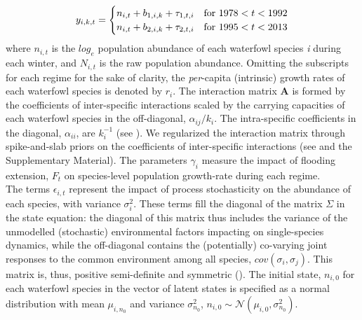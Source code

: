\documentclass[12pt]{article}
\begin{document}
\begin{equation}\label{LVR_Obs_Equation_form}
	y_{i,k,t} =
	\begin{cases}
		n_{i,t} + b_{1,i,k} + \tau_{1,t,i} & \text{for $ 1978 < t < 1992 $}\\
		n_{i,t} + b_{2,i,k} + \tau_{2,t,i} & \text{for $ 1995 < t < 2013 $}\\
	\end{cases}
\end{equation}
where $ n_{i,t} $ is the $log_{e}$ population abundance of each waterfowl species \textit{i} during each winter, and $ N_{i,t} $ is the raw population abundance. Omitting the subscripts for each regime for the sake of clarity, the \textit{per}-capita (intrinsic) growth rates of each waterfowl species is denoted by $ r_{i} $. The interaction matrix $ \mathbf{A} $ is formed by the coefficients of inter-specific interactions scaled by the carrying capacities of each waterfowl species in the off-diagonal, $ \alpha_{ij}/\textit{k}_{i} $. The intra-specific coefficients in the diagonal, $ \alpha_{ii} $, are $ \textit{k}_{i}^{-1} $ (see \cite{Ranta2006,Mutshinda2009,Almaraz2011}). We regularized the interaction matrix through spike-and-slab priors on the coefficients of inter-specific interactions (see \cite{Almaraz2012} and the Supplementary Material). The parameters $\gamma_{i}$ measure the impact of flooding extension, $F_{t}$ on species-level population growth-rate during each regime. \\

The terms $\epsilon_{i,t}$ represent the impact of process stochasticity on the abundance of each species, with variance $\sigma^2_{i}$. These terms fill the diagonal of the matrix $ \Sigma $ in the state equation: the diagonal of this matrix thus includes the variance of the unmodelled (stochastic) environmental factors impacting on single-species dynamics, while the off-diagonal contains the (potentially) co-varying joint responses to the common environment among all species, $ cov(\sigma_{i},\sigma_{j}) $. This matrix is, thus, positive semi-definite and symmetric (\cite{Almaraz2011,Almaraz2012}). The initial state, $ n_{i,0} $ for each waterfowl species in the vector of latent states is specified as a normal distribution with mean $ \mu_{i,n_{0}} $ and variance $ \sigma^2_{n_{0}} $, $ n_{i,0} \sim \mathcal{N}(\mu_{i,0}, \sigma^2_{n_{0}}) $.\\
\end{document}

